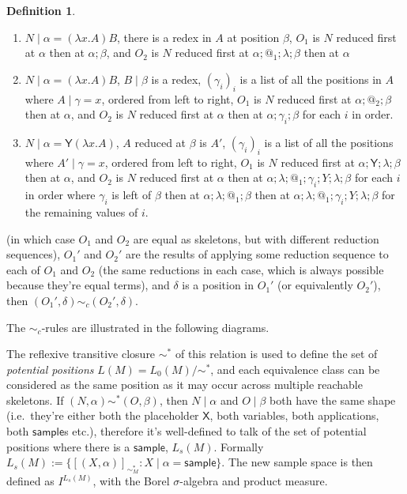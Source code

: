 \documentclass{article}
\newcommand{\tY}{\mathsf{Y}}
\newcommand{\tsample}{\mathsf{sample}}
\newcommand{\skeletonPlaceholder}{\mathsf{X}} %
\theoremstyle{definition}
\newtheorem{definition}{Definition}
\theoremstyle{lemma}
\theoremstyle{remark}
\begin{document}
\begin{definition}
\begin{enumerate}
\begin{enumerate}
        \item $N \mid \alpha = (\lambda x. A) B$, there is a redex in $A$ at position $\beta$, $O_1$ is $N$ reduced first at $\alpha$ then at $\alpha;\beta$, and $O_2$ is $N$ reduced first at $\alpha;@_1;\lambda;\beta$ then at $\alpha$
        
        \item $N \mid \alpha = (\lambda x. A) B$, $B \mid \beta$ is a redex, $(\gamma_i)_i$ is a list of all the positions in $A$ where $A \mid \gamma = x$, ordered from left to right, $O_1$ is $N$ reduced first at $\alpha ; @_2 ; \beta$ then at $\alpha$, and $O_2$ is $N$ reduced first at $\alpha$ then at $\alpha;\gamma_i;\beta$ for each $i$ in order.
        
        \item $N \mid \alpha = \tY (\lambda x. A)$, $A$ reduced at $\beta$ is $A'$, $(\gamma_i)_i$ is a list of all the positions where $A' \mid \gamma  = x$, ordered from left to right, $O_1$ is $N$ reduced first at $\alpha;\tY;\lambda;\beta$ then at $\alpha$, and $O_2$ is $N$ reduced first at $\alpha$ then at $\alpha;\lambda;@_1;\gamma_i;Y;\lambda;\beta$ for each $i$ in order where $\gamma_i$ is left of $\beta$ then at $\alpha;\lambda;@_1;\beta$ then at $\alpha;\lambda;@_1;\gamma_i;Y;\lambda;\beta$ for the remaining values of $i$.
    \end{enumerate}
    (in which case $O_1$ and $O_2$ are equal as skeletons, but with different reduction sequences), $O_1'$ and $O_2'$ are the results of applying some reduction sequence to each of $O_1$ and $O_2$ (the same reductions in each case, which is always possible because they're equal terms), and $\delta$ is a position in $O_1'$ (or equivalently $O_2'$), then $(O_1',\delta) \sim_c (O_2',\delta)$.
\end{enumerate}
The $\sim_c$-rules are illustrated in the following diagrams.
\end{definition}




The reflexive transitive closure $\sim^*$ of this relation is used to define the set of \emph{potential positions} $L(M) = L_0(M) / \sim^*$, and each equivalence class can be considered as the same position as it may occur across multiple reachable skeletons. 
If $(N,\alpha) \sim^* (O,\beta)$, then $N \mid \alpha$ and $O \mid \beta$ both have the same shape (i.e.~they're either both the placeholder $\skeletonPlaceholder$, both variables, both applications, both $\tsample$s etc.), therefore it's well-defined to talk of the set of potential positions where there is a $\tsample$, $L_s(M)$. 
Formally $L_s(M) := \{[(X, \alpha)]_{\sim^\ast_M} : X \mid \alpha = \tsample\}$.
The new sample space is then defined as $I^{L_s(M)}$, with the Borel $\sigma$-algebra and product measure.
\end{document}
